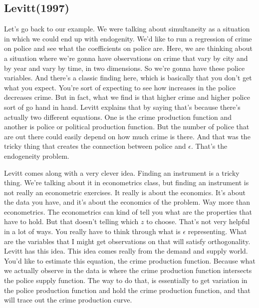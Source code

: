\documentclass[11pt,a4paper]{amsart}
\theoremstyle{plain}
\theoremstyle{definition}
\begin{document}
\subsection{Levitt(1997)}
 		 Let's go back to our example. We were talking about simultaneity as a situation in which we could end up with endogenity. We'd like to run a regression of crime on police and see what the coefficients on police are. Here, we are thinking about a situation where we're gonna have observations on crime that vary by city and by year and vary by time, in two dimensions. So we're gonna have these police variables. And there's a classic finding here, which is basically that you don't get what you expect. You're sort of expecting to see how increases in the police decreases crime.  But in fact, what we find is that higher crime and higher police sort of go hand in hand. Levitt explains that by saying that's because there's actually two different equations. One is the crime production function and another is police or political production function. But the number of police that are out there could easily depend on how much crime is there. And that was the tricky thing that creates the connection between police and $\epsilon$. That's the endogeneity problem.\par 
 		  Levitt comes along with a very clever idea. Finding an instrument is a tricky thing. We're talking about it in econometrics class, but finding an instrument is not really an econometric exercises.  It really is about the economics. It's about the data you have, and it's about the economics of the problem. Way more than econometrics. The econometrics can kind of tell you what are the properties that have to hold. But that doesn't telling which $z$ to choose. That's not very helpful in a lot of ways.  You really have to think through what is $\epsilon$ representing. What are the variables that I might get observations on that will satisfy orthogonality. Levitt has this idea. This idea comes really from the demand and supply world. You'd like to estimate this equation, the crime production function. Because what we actually observe in the data is where the crime production function intersects the police supply function. The way to do that, is essentially to get variation in the police production function and hold the crime production function, and that will trace out the crime production curve. \par 
\end{document}

